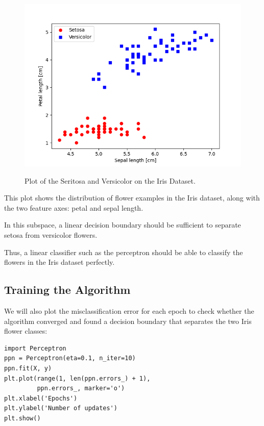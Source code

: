 \documentclass[../machine_learning_scikit.tex]{subfiles}
\begin{document}
    \begin{figure}[h]
        \begin{minipage}{\textwidth}
            \centering
            \includegraphics[scale=1]{images/iris_plot_seritosa_virginica.png} \\
            \caption{Plot of the Seritosa and Versicolor on the Iris Dataset.}
            \label{figure:iris_seritosa_versicolor_plot}
        \end{minipage}
    \end{figure}

    This plot shows the distribution of flower examples in the Iris dataset, along with the two feature axes: petal and sepal length.

    \begin{obs}
        In this subspace, a linear decision boundary should be sufficient to separate setosa from versicolor flowers.
    \end{obs}

    Thus, a linear classifier such as the perceptron should be able to classify the flowers in the Iris dataset perfectly.

    \subsection{Training the Algorithm}

    We will also plot the misclassification error for each epoch to check whether the algorithm converged and found a decision boundary that separates the two Iris flower classes:

    \begin{lstlisting}[caption={Training the Perceptron Algorithm with the Iris Dataset},label=code:training_perceptron]
import Perceptron
ppn = Perceptron(eta=0.1, n_iter=10)
ppn.fit(X, y)
plt.plot(range(1, len(ppn.errors_) + 1),
         ppn.errors_, marker='o')
plt.xlabel('Epochs')
plt.ylabel('Number of updates')
plt.show()
    \end{lstlisting}
\end{document}
